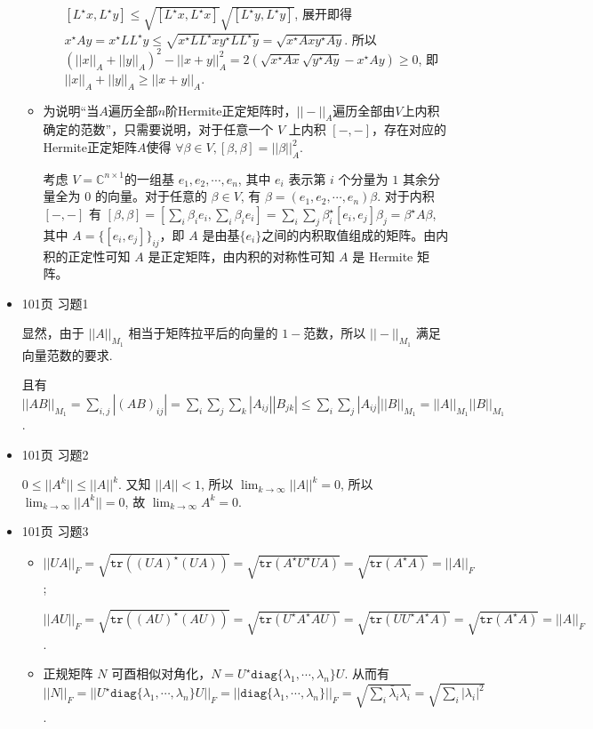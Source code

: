 \documentclass{article}
\begin{document}
\begin{spacing}{1.5}
\begin{itemize}
\begin{itemize}
\begin{itemize}
            $[L^\star x, L^\star y] \leq \sqrt{[L^\star x, L^\star x]}\sqrt{[L^\star y, L^\star y]}$, 展开即得 $x^\star Ay = x^\star LL^\star y \leq \sqrt{x^\star LL^\star x y^\star LL^\star y}=\sqrt{x^\star Axy^\star Ay}$. 所以 $(||x||_A + ||y||_A)^2 - ||x+y||_A^2 = 2\left(\sqrt{x^\star Ax}\sqrt{y^\star Ay} - x^\star Ay\right) \geq 0$, 即 $||x||_A + ||y||_A \geq ||x + y||_A$.
        \end{itemize}
        \item [(2)] 为说明“当$A$遍历全部$n$阶Hermite正定矩阵时，$||-||_A$遍历全部由$V$上内积确定的范数”，只需要说明，对于任意一个 $V$ 上内积 $[-,-]$，存在对应的Hermite正定矩阵$A$使得 $\forall \beta\in V, [\beta, \beta] = ||\beta||_A^2$.
        
        考虑 $V=\mathbb{C}^{n\times 1}$的一组基 $e_1, e_2, \cdots, e_n$, 其中 $e_i$ 表示第 $i$ 个分量为 $1$ 其余分量全为 $0$ 的向量。对于任意的 $\beta \in V$, 有 $\beta = (e_1, e_2, \cdots, e_n)\beta$. 对于内积 $[-, -]$ 有 $[\beta, \beta] = [\sum_{i}\beta_ie_i, \sum_{i}\beta_ie_i]=\sum_{i}\sum_{j}\beta_i^\star [e_i, e_j] \beta_j = \beta^\star A\beta$, 其中 $A = \{[e_i, e_j]\}_{ij}$，即 $A$ 是由基$\{e_i\}$之间的内积取值组成的矩阵。由内积的正定性可知 $A$ 是正定矩阵，由内积的对称性可知 $A$ 是 Hermite 矩阵。
    \end{itemize}

    \item [4.] 101页 习题1 
    
    显然，由于 $||A||_{M_1}$ 相当于矩阵拉平后的向量的 $1-$范数，所以 $||-||_{M_1}$  满足向量范数的要求. 
    
    且有 $||AB||_{M_1} = \sum_{i,j} |(AB)_{ij}| = \sum_i\sum_j\sum_k |A_{ij}||B_{jk}| \leq \sum_{i}\sum_{j} |A_{ij}|||B||_{M_1} = ||A||_{M_1} ||B||_{M_1}$.

    \item [5.] 101页 习题2 
    
    $0 \leq ||A^k|| \leq ||A||^k$. 又知 $||A|| < 1$, 所以 $\lim_{k\to\infty} ||A||^k = 0$, 所以 $\lim_{k\to\infty} ||A^k|| = 0$, 故 $\lim_{k\to\infty} A^k = 0$.

    \item [6.] 101页 习题3
    \begin{itemize}
        \item [(1)]
        $||UA||_F = \sqrt{\mathtt{tr}\left((UA)^\star(UA)\right)}=\sqrt{\mathtt{tr}(A^\star U^\star UA)} = \sqrt{\mathtt{tr}(A^\star A)} = ||A||_F$; 
    
        $||AU||_F = \sqrt{\mathtt{tr}\left((AU)^\star (AU)\right)}=\sqrt{\mathtt{tr}(U^\star A^\star AU)} = \sqrt{\mathtt{tr}(UU^\star A^\star A)} = \sqrt{\mathtt{tr}(A^\star A)} = ||A||_F$.
        \item [(2)]
        正规矩阵 $N$ 可酉相似对角化，$N = U^\star\mathtt{diag}\{\lambda_1, \cdots, \lambda_n\}U$. 从而有 $||N||_F = ||U^\star\mathtt{diag}\{\lambda_1, \cdots, \lambda_n\}U||_F = ||\mathtt{diag}\{\lambda_1, \cdots, \lambda_n\}||_F = \sqrt{\sum_i \bar{\lambda}_i\lambda_i} = \sqrt{\sum_i |\lambda_i|^2}$.


\end{itemize}
\end{itemize}
\end{spacing}
\end{document}
